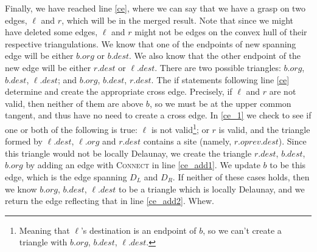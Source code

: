 \documentclass[12pt,twoside]{reedthesis}
\begin{document}
        Finally, we have reached line \ref{ce}, where we can say that we have a grasp on two edges, $\ell$ and $r$, which will be in the merged result. Note that since we might have deleted some edges, $\ell$ and $r$ might not be edges on the convex hull of their respective triangulations. We know that one of the endpoints of new spanning edge will be either $b.org$ or $b.dest$. We also know that the other endpoint of the new edge will be either $r.dest$ or $\ell.dest$. There are two possible triangles: $b.org$, $b.dest$, $\ell.dest$; and $b.org$, $b.dest$, $r.dest$. The if statements following line \ref{ce} determine and create the appropriate cross edge. Precisely, if $\ell$ and $r$ are not valid, then neither of them are above $b$, so we must be at the upper common tangent, and thus have no need to create a cross edge. In \ref{ce_1} we check to see if one or both of the following is true: $\ell$ is not valid\footnote{Meaning that $\ell$'s destination is an endpoint of $b$, so we can't create a triangle with $b.org$, $b.dest$, $\ell.dest$.}; or $r$ is valid, and the triangle formed by $\ell.dest$, $\ell.org$ and $r.dest$ contains a site (namely, $r.oprev.dest$). Since this triangle would not be locally Delaunay, we create the triangle $r.dest$, $b.dest$, $b.org$ by adding an edge with \textsc{Connect} in line \ref{ce_add1}. We update $b$ to be this edge, which is the  edge spanning $D_{L}$ and $D_{R}$. If neither of these cases holds, then we know $b.org$, $b.dest$, $\ell.dest$ to be a triangle which is locally Delaunay, and we return the edge reflecting that in line \ref{ce_add2}. Whew.


\end{document}

